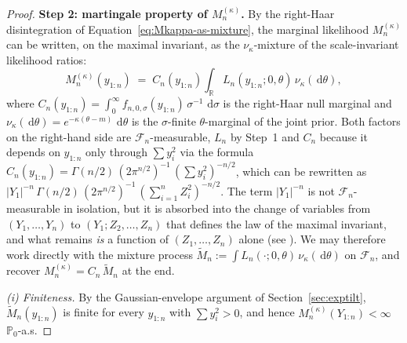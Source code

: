 \documentclass[numsec,webpdf,modern,medium,namedate]{oup-authoring-template}
\theoremstyle{thmstyleone}%
\theoremstyle{thmstyletwo}%
\theoremstyle{thmstylethree}%
\newcommand{\dd}{\,\mathrm{d}}
\newcommand{\1}{\mathbf{1}}
\begin{document}
\begin{appendices}
\begin{proof}
\textbf{Step 2: martingale property of $M_n^{(\kappa)}$.}
By the right-Haar disintegration of Equation~\eqref{eq:Mkappa-as-mixture}, the marginal likelihood $M_n^{(\kappa)}$ can be written, on the maximal invariant,
as the $\nu_\kappa$-mixture of the scale-invariant likelihood ratios:
\begin{equation}\label{eq:M-as-mixture-Ln}
   M_n^{(\kappa)}(y_{1:n})
   \;=\; C_n(y_{1:n})\int_\mathbb{R} L_n(y_{1:n};0,\theta)\,\nu_\kappa(\dd\theta),
\end{equation}
where $C_n(y_{1:n}) = \int_0^\infty f_{n,0,\sigma}(y_{1:n})\,\sigma^{-1}\,\dd\sigma$
is the right-Haar null marginal and $\nu_\kappa(\dd\theta) = e^{-\kappa(\theta-m)}\,\dd\theta$
is the $\sigma$-finite $\theta$-marginal of the joint prior. Both factors on
the right-hand side are $\mathcal{F}_n$-measurable, $L_n$ by Step~1 and $C_n$ because it depends on $y_{1:n}$ only
through $\sum y_i^2$ via the formula
$C_n(y_{1:n}) = \Gamma(n/2)\,(2\pi^{n/2})^{-1}\,(\sum y_i^2)^{-n/2}$, which can be rewritten as
$|Y_1|^{-n}\,\Gamma(n/2)\,(2\pi^{n/2})^{-1}\,(\sum_{i=1}^n Z_i^2)^{-n/2}$. The term $|Y_1|^{-n}$ is not $\mathcal{F}_n$-measurable in isolation, but it is absorbed into the change of variables from $(Y_1,\dots,Y_n)$ to
$(Y_1; Z_2,\dots,Z_n)$ that defines the law of the maximal invariant, and
what remains \emph{is} a function of $(Z_1,\dots,Z_n)$ alone (see
\cite[proof of Cor.~4.6]{Wang2025}). We may therefore work directly with the
mixture process $\widetilde M_n := \int L_n(\cdot;0,\theta)\,\nu_\kappa(\dd\theta)$
on $\mathcal{F}_n$, and recover $M_n^{(\kappa)} = C_n\,\widetilde M_n$ at the
end.

\smallskip\noindent\emph{(i) Finiteness.}
By the Gaussian-envelope argument of Section~\ref{sec:exptilt},
$\widetilde M_n(y_{1:n})$ is finite for every $y_{1:n}$ with $\sum y_i^2 > 0$,
and hence $M_n^{(\kappa)}(Y_{1:n}) < \infty$ $\mathbb{P}_0$-a.s.


\end{proof}
\end{appendices}
\end{document}
